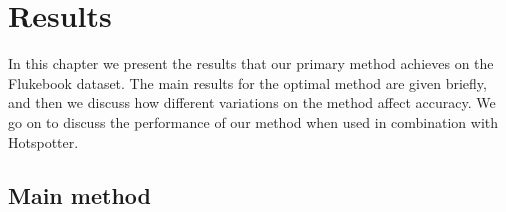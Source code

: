 

\chapter{Results} \label{sec:results}

In this chapter we present the results that our primary method achieves on the Flukebook dataset.
The main results for the optimal method are given briefly, and then we discuss how different variations on the method affect accuracy.
We go on to discuss the performance of our method when used in combination with Hotspotter.

\section{Main method}

